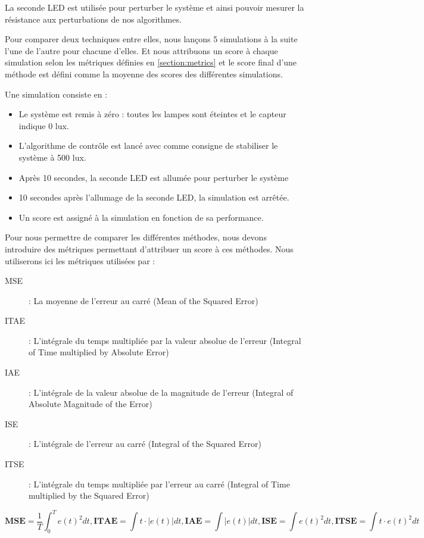 \documentclass[a4paper,10pt]{report}
\begin{document}
La seconde LED est utilisée pour perturber le système et ainsi pouvoir mesurer la résistance aux perturbations de nos algorithmes.

Pour comparer deux techniques entre elles, nous lançons 5 simulations à la suite l'une de l'autre pour chacune d'elles.
Et nous attribuons un score à chaque simulation selon les métriques définies en \ref{section:metrics} et le score final d'une méthode est défini comme la moyenne des scores des différentes simulations.

Une simulation consiste en :
\begin{itemize}
    \item Le système est remis à zéro : toutes les lampes sont éteintes et le capteur indique 0 lux.
    \item L'algorithme de contrôle est lancé avec comme consigne de stabiliser le système à 500 lux.
    \item Après 10 secondes, la seconde LED est allumée pour perturber le système
    \item 10 secondes après l'allumage de la seconde LED, la simulation est arrêtée.
    \item Un score est assigné à la simulation en fonction de sa performance.
    \\
\end{itemize}

\label{section:metrics}
Pour nous permettre de comparer les différentes méthodes, nous devons introduire des métriques permettant d'attribuer un score à ces méthodes.
Nous utiliserons ici les métriques utilisées par \cite{griffin2003line, mirzal2012pid} :
\begin{description}
    \item[MSE] : La moyenne de l'erreur au carré (Mean of the Squared Error)
    \item[ITAE] : L'intégrale du temps multipliée par la valeur absolue de l'erreur  (Integral of Time multiplied by Absolute Error)
    \item[IAE] : L'intégrale de la valeur absolue de la magnitude de l'erreur (Integral of Absolute Magnitude of the Error)
    \item[ISE] : L'intégrale de l'erreur au carré (Integral of the Squared Error)
    \item[ITSE] : L'intégrale du temps multipliée par l'erreur au carré (Integral of Time multiplied by the Squared Error)
\end{description}

$$
\textbf{MSE} = \frac{1}{T} \int_0^T e(t)^2 dt,
\textbf{ITAE} = \int t \cdot |e(t)| dt,
\textbf{IAE} = \int |e(t)| dt,
\textbf{ISE} = \int e(t)^2 dt,
\textbf{ITSE} = \int t \cdot e(t)^2 dt
$$
\end{document}
